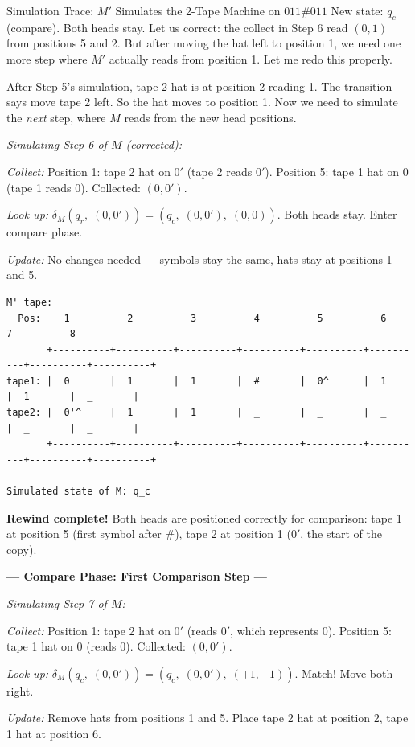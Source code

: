 \begin{examplebox}{{Simulation Trace: $M'$ Simulates the 2-Tape Machine on $011\#011$}}
New state: $q_c$ (compare). Both heads stay. Let us correct: the collect in Step 6 read $(0, 1)$ from positions 5 and 2. But after moving the hat left to position 1, we need one more step where $M'$ actually reads from position 1. Let me redo this properly.

After Step 5's simulation, tape 2 hat is at position 2 reading 1. The transition says move tape 2 left. So the hat moves to position 1. Now we need to simulate the \textit{next} step, where $M$ reads from the new head positions.

\textit{Simulating Step 6 of $M$ (corrected):}

\textit{Collect:} Position 1: tape 2 hat on $0'$ (tape 2 reads $0'$). Position 5: tape 1 hat on 0 (tape 1 reads 0). Collected: $(0, 0')$.

\textit{Look up:} $\delta_M(q_r,\;(0, 0')) = (q_c,\;(0, 0'),\;(0, 0))$. Both heads stay. Enter compare phase.

\textit{Update:} No changes needed --- symbols stay the same, hats stay at positions 1 and 5.

\begin{lstlisting}
M' tape:
  Pos:    1          2          3          4          5          6          7          8
       +----------+----------+----------+----------+----------+----------+----------+----------+
tape1: |  0       |  1       |  1       |  #       |  0^      |  1       |  1       |  _       |
tape2: |  0'^     |  1       |  1       |  _       |  _       |  _       |  _       |  _       |
       +----------+----------+----------+----------+----------+----------+----------+----------+

Simulated state of M: q_c
\end{lstlisting}

\textbf{Rewind complete!} Both heads are positioned correctly for comparison: tape 1 at position 5 (first symbol after $\#$), tape 2 at position 1 ($0'$, the start of the copy).

\bigskip
\textbf{--- Compare Phase: First Comparison Step ---}

\textit{Simulating Step 7 of $M$:}

\textit{Collect:} Position 1: tape 2 hat on $0'$ (reads $0'$, which represents 0). Position 5: tape 1 hat on 0 (reads 0). Collected: $(0, 0')$.

\textit{Look up:} $\delta_M(q_c,\;(0, 0')) = (q_c,\;(0, 0'),\;(+1, +1))$. Match! Move both right.

\textit{Update:} Remove hats from positions 1 and 5. Place tape 2 hat at position 2, tape 1 hat at position 6.


\end{examplebox}
